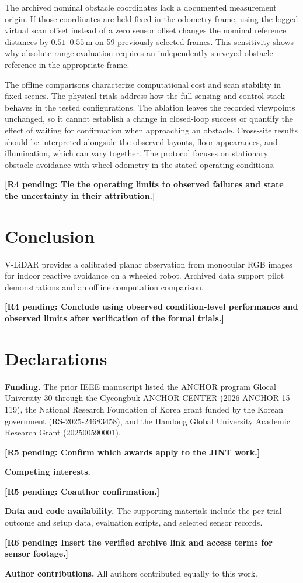 \documentclass[pdflatex,sn-mathphys-num]{sn-jnl}
\newif\ifdraftreview
\newcommand{\reviewbadge}[1]{%
  \colorbox{reviewfill}{\textcolor{reviewink}{\sffamily\bfseries\strut #1}}}
\newcommand{\pending}[2]{%
  \ifdraftreview
    \hyperlink{author-checklist}{\reviewbadge{#1}}\nobreak\space
    \textcolor{reviewink}{\textbf{[Pending: #2]}}%
  \else
    \textbf{[#1 pending: #2]}%
  \fi}
\newcommand{\vlidar}{V-LiDAR}
\newcommand{\m}{\,\mathrm{m}}
\begin{document}
The archived nominal obstacle coordinates lack a documented measurement origin. If those coordinates are held fixed in the odometry frame, using the logged virtual scan offset instead of a zero sensor offset changes the nominal reference distances by $0.51$--$0.55\m$ on 59 previously selected frames. This sensitivity shows why absolute range evaluation requires an independently surveyed obstacle reference in the appropriate frame.

The offline comparisons characterize computational cost and scan stability in fixed scenes. The physical trials address how the full sensing and control stack behaves in the tested configurations. The ablation leaves the recorded viewpoints unchanged, so it cannot establish a change in closed-loop success or quantify the effect of waiting for confirmation when approaching an obstacle. Cross-site results should be interpreted alongside the observed layouts, floor appearances, and illumination, which can vary together. The protocol focuses on stationary obstacle avoidance with wheel odometry in the stated operating conditions.

\pending{R4}{Tie the operating limits to observed failures and state the uncertainty in their attribution.}

\section{Conclusion}\label{sec:conclusion}

\vlidar{} provides a calibrated planar observation from monocular RGB images for indoor reactive avoidance on a wheeled robot. Archived data support pilot demonstrations and an offline computation comparison. \pending{R4}{Conclude using observed condition-level performance and observed limits after verification of the formal trials.}

\section*{Declarations}
\label{sec:declarations}

\textbf{Funding.} The prior IEEE manuscript listed the ANCHOR program Glocal University 30 through the Gyeongbuk ANCHOR CENTER (2026-ANCHOR-15-119), the National Research Foundation of Korea grant funded by the Korean government (RS-2025-24683458), and the Handong Global University Academic Research Grant (202500590001). \pending{R5}{Confirm which awards apply to the JINT work.}

\noindent\textbf{Competing interests.} \pending{R5}{Coauthor confirmation.}

\noindent\textbf{Data and code availability.} The supporting materials include the per-trial outcome and setup data, evaluation scripts, and selected sensor records. \pending{R6}{Insert the verified archive link and access terms for sensor footage.}

\noindent\textbf{Author contributions.} All authors contributed equally to this work.


\end{document}

